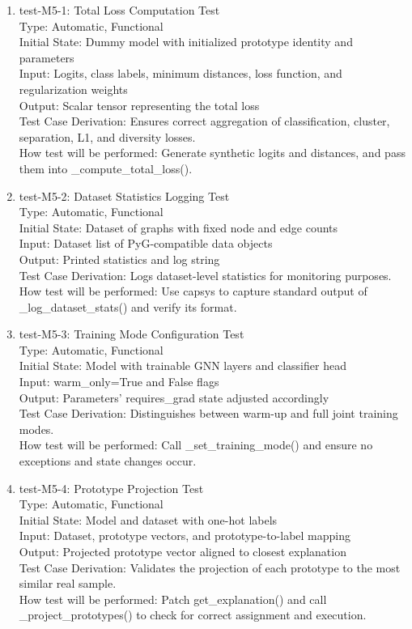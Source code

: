 \documentclass[12pt, titlepage]{article}
\begin{document}
\begin{enumerate}

\item{test-M5-1: Total Loss Computation Test\\}
Type: Automatic, Functional \\
Initial State: Dummy model with initialized prototype identity and parameters \\
Input: Logits, class labels, minimum distances, loss function, and regularization weights \\
Output: Scalar tensor representing the total loss \\
Test Case Derivation: Ensures correct aggregation of classification, cluster, separation, L1, and diversity losses. \\
How test will be performed: Generate synthetic logits and distances, and pass them into \_compute\_total\_loss().

\item{test-M5-2: Dataset Statistics Logging Test\\}
Type: Automatic, Functional \\
Initial State: Dataset of graphs with fixed node and edge counts \\
Input: Dataset list of PyG-compatible data objects \\
Output: Printed statistics and log string \\
Test Case Derivation: Logs dataset-level statistics for monitoring purposes. \\
How test will be performed: Use capsys to capture standard output of \_log\_dataset\_stats() and verify its format.

\item{test-M5-3: Training Mode Configuration Test\\}
Type: Automatic, Functional \\
Initial State: Model with trainable GNN layers and classifier head \\
Input: warm\_only=True and False flags \\
Output: Parameters’ requires\_grad state adjusted accordingly \\
Test Case Derivation: Distinguishes between warm-up and full joint training modes. \\
How test will be performed: Call \_set\_training\_mode() and ensure no exceptions and state changes occur.

\item{test-M5-4: Prototype Projection Test\\}
Type: Automatic, Functional \\
Initial State: Model and dataset with one-hot labels \\
Input: Dataset, prototype vectors, and prototype-to-label mapping \\
Output: Projected prototype vector aligned to closest explanation \\
Test Case Derivation: Validates the projection of each prototype to the most similar real sample. \\
How test will be performed: Patch get\_explanation() and call \_project\_prototypes() to check for correct assignment and execution.


\end{enumerate}
\end{document}
